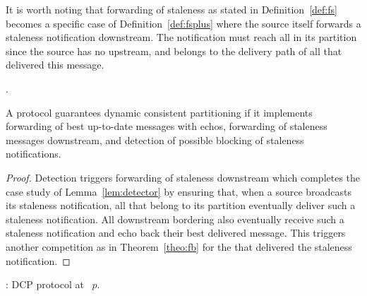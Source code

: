 It is worth noting that forwarding of staleness as stated in
Definition~\ref{def:fs} becomes a specific case of
Definition~\ref{def:fsplus} where the source itself forwards a
staleness notification downstream. The notification must reach all
\processes in its partition since the source has no \processes
upstream, and belongs to the delivery path of all \processes that
delivered this message.

.

\begin{theorem}
  A protocol guarantees dynamic consistent partitioning if it
  implements forwarding of best up-to-date messages with echos,
  forwarding of staleness messages downstream, and detection of
  possible blocking of staleness notifications.
\end{theorem}

\begin{proof}
  Detection triggers forwarding of staleness downstream which
  completes the case study of Lemma~\ref{lem:detector} by ensuring
  that, when a source broadcasts its staleness notification, all
  \processes that belong to its partition eventually deliver such a
  staleness notification. All downstream bordering \processes also
  eventually receive such a staleness notification and echo back their
  best delivered message. This triggers another competition as in
  Theorem~\ref{theo:fb} for the \processes that delivered the
  staleness notification.
\end{proof}

\begin{algorithm}
  
  \caption{\label{algo:ascast}\NAME: DCP protocol at \Process~$p$.}
\end{algorithm}

